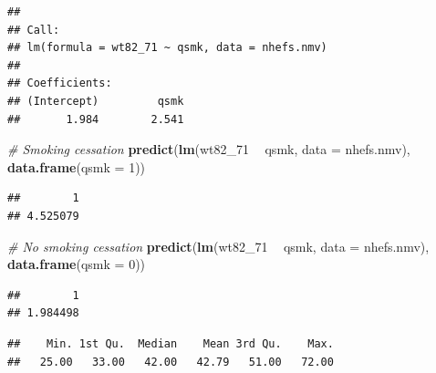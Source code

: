 \documentclass[
  10pt,
]{book}
\newenvironment{Shaded}{\begin{snugshade}}{\end{snugshade}}
\newcommand{\CommentTok}[1]{\textcolor[rgb]{0.56,0.35,0.01}{\textit{#1}}}
\newcommand{\DataTypeTok}[1]{\textcolor[rgb]{0.13,0.29,0.53}{#1}}
\newcommand{\DecValTok}[1]{\textcolor[rgb]{0.00,0.00,0.81}{#1}}
\newcommand{\KeywordTok}[1]{\textcolor[rgb]{0.13,0.29,0.53}{\textbf{#1}}}
\newcommand{\NormalTok}[1]{#1}
\newcommand{\OperatorTok}[1]{\textcolor[rgb]{0.81,0.36,0.00}{\textbf{#1}}}
\newcommand{\StringTok}[1]{\textcolor[rgb]{0.31,0.60,0.02}{#1}}
\begin{document}
\begin{verbatim}
## 
## Call:
## lm(formula = wt82_71 ~ qsmk, data = nhefs.nmv)
## 
## Coefficients:
## (Intercept)         qsmk  
##       1.984        2.541
\end{verbatim}

\begin{Shaded}
\begin{Highlighting}[]
\CommentTok{# Smoking cessation}
\KeywordTok{predict}\NormalTok{(}\KeywordTok{lm}\NormalTok{(wt82_}\DecValTok{71} \OperatorTok{~}\StringTok{ }\NormalTok{qsmk, }\DataTypeTok{data =}\NormalTok{ nhefs.nmv), }\KeywordTok{data.frame}\NormalTok{(}\DataTypeTok{qsmk =} \DecValTok{1}\NormalTok{))}
\end{Highlighting}
\end{Shaded}

\begin{verbatim}
##        1 
## 4.525079
\end{verbatim}

\begin{Shaded}
\begin{Highlighting}[]
\CommentTok{# No smoking cessation}
\KeywordTok{predict}\NormalTok{(}\KeywordTok{lm}\NormalTok{(wt82_}\DecValTok{71} \OperatorTok{~}\StringTok{ }\NormalTok{qsmk, }\DataTypeTok{data =}\NormalTok{ nhefs.nmv), }\KeywordTok{data.frame}\NormalTok{(}\DataTypeTok{qsmk =} \DecValTok{0}\NormalTok{)) }
\end{Highlighting}
\end{Shaded}

\begin{verbatim}
##        1 
## 1.984498
\end{verbatim}

\begin{Shaded}
\end{Shaded}

\begin{verbatim}
##    Min. 1st Qu.  Median    Mean 3rd Qu.    Max. 
##   25.00   33.00   42.00   42.79   51.00   72.00
\end{verbatim}

\begin{Shaded}
\end{Shaded}
\end{document}
